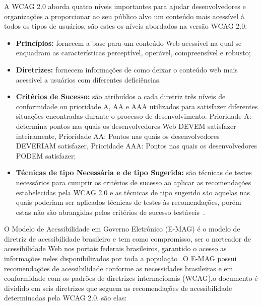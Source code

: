 A WCAG 2.0 aborda quatro n\'iveis importantes para ajudar desenvolvedores e
organiza\c{c}\~oes a proporcionar ao seu p\'ublico alvo um conte\'udo mais
acess\'ivel \`a todos os tipos de usu\'arios, s\~ao estes os n\'iveis abordados
na vers\~ao WCAG 2.0:

\begin{itemize}
  \item \textbf{Princ\'ipios:} fornecem a base para um conte\'udo Web
  acess\'ivel na qual se enquadram as caracter\'isticas percept\'ivel, oper\'avel,
  compreens\'ivel e robusto;
  \item \textbf{Diretrizes:} fornecem informa\c{c}\~oes de como deixar o
  conte\'udo web mais acess\'ivel a usu\'arios com diferentes defici\^encias.
  \item \textbf{Crit\'erios de Sucesso:} s\~ao atribu\'idos a cada diretriz
  tr\^es n\'iveis de conformidade ou prioridade A, AA e AAA utilizados para
  satisfazer diferentes situa\c{c}\~oes encontradas durante o processo de
  desenvolvimento. Prioridade A: determina pontos nas quais os desenvolvedores
  Web DEVEM satisfazer inteiramente, Prioridade AA: Pontos nas quais os
  desenvolvedores DEVERIAM satisfazer, Prioridade AAA: Pontos nas quais os
  desenvolvedores PODEM satisfazer;
  \item \textbf{T\'ecnicas de tipo Necess\'aria e de tipo Sugerida:} s\~ao
  t\'ecnicas de testes necess\'arios para cumprir os crit\'erios de sucesso ao
  aplicar as recomenda\c{c}\~oes estabelecidas pela WCAG 2.0 e as t\'ecnicas de tipo
  sugerido s\~ao aquelas nas quais poderiam ser aplicados t\'ecnicas de testes
  \`as recomenda\c{c}\~oes, por\'em estas n\~ao s\~ao abrangidas pelos crit\'erios
  de sucesso test\'aveis~\cite{Caldwell}.
\end{itemize} 

O Modelo de Acessibilidade em Governo Eletr\^onico (E-MAG) \'e o modelo de
diretriz de acessibilidade brasileiro e  tem como compromisso, ser o norteador de
acessibilidade Web nos portais federais brasileiros, garantido o acesso as
informa\c{c}\~oes neles disponibilizados por toda a
popula\c{c}\~ao~\cite{eMAG}.O E-MAG possui recomenda\c{c}\~oes de acessibilidade
conforme as necessidades brasileiras e em conformidade com os padr\~oes de
diretrizes internacionais (WCAG),o documento \'e dividido em seis diretrizes que
seguem as recomenda\c{c}\~oes de acessibilidade determinadas pela WCAG 2.0,
s\~ao elas:

